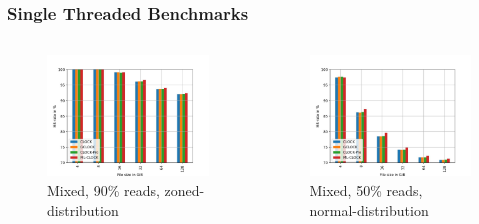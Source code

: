\documentclass[
	aspectratio=169,
	compress,
]{beamer}
\newcommand{\navframetitle}[1]{\frametitle{#1\hfill{\footnotesize\lastsection{}}}}
\begin{document}
\begin{frame}[fragile]
	\navframetitle{Single Threaded Benchmarks}

	\begin{columns}
		\begin{column}{0.5\textwidth}
			\begin{figure}
				\includegraphics[width=\textwidth]{rw_90to10_zoned.jpg}
        		\caption{Mixed, 90\% reads, zoned-distribution}
        		\label{fig:single rw_90to10  zoned}
			\end{figure}
		\end{column}
		\begin{column}{0.5\textwidth}
			\begin{figure}[ht]
    			\centering
    			\includegraphics[width=\textwidth]{rw_50to50_normal.jpg}
        		\caption{Mixed, 50\% reads, normal-distribution}
        		\label{fig:single rw_90to10  normal}
			\end{figure}			
		\end{column}
	\end{columns}
\end{frame}
\end{document}
